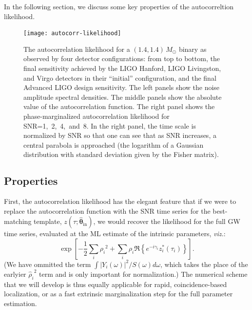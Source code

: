 \documentclass[amsmath,amssymb,aps,prx,reprint,nopreprintnumbers,nofootinbib]{revtex4-1}
\begin{document}
In the following section, we discuss some key properties of the autocorreltion likelihood.

\begin{figure}
    \texttt{[image: autocorr-likelihood]}
    \caption{\label{fig:autocorr-likelihood}The autocorrelation likelihood for a $(1.4, 1.4)$\,$M_\odot$ binary as observed by four detector configurations: from top to bottom, the final sensitivity achieved by the \acs{LIGO} Hanford, \acs{LIGO} Livingston, and Virgo detectors in their ``initial'' configuration, and the final Advanced \acs{LIGO} design sensitivity. The left panels show the noise amplitude spectral densities. The middle panels show the absolute value of the autocorrelation function. The right panel shows the phase-marginalized autocorrelation likelihood for \ac{SNR}=1,~2,~4,~and~8. In the right panel, the time scale is normalized by \ac{SNR} so that one can see that as \ac{SNR} increases, a central parabola is approached (the logarithm of a Gaussian distribution with standard deviation given by the Fisher matrix).}
\end{figure}

\subsection{Properties}
\label{sec:properties}

First, the autocorrelation likelihood has the elegant feature that if we were to replace the autocorrelation function with the \ac{SNR} time series for the best-matching template, $z(\tau; \hat{\mathbf{\theta}}_\mathrm{in})$, we would recover the likelihood for the full \ac{GW} time series, evaluated at the \ac{ML} estimate of the intrinsic parameters, \emph{viz.}:
%
\begin{equation}\label{eq:extrinsic-only-likelihood}
    \exp \left[ - \frac{1}{2} \sum_i {\rho_i}^2
        + \sum_i \rho_i \Re \left\{ e^{-i \gamma_i} z_i^*(\tau_i)
        \right\}
    \right].
\end{equation}
%
(We have ommitted the term $\int |Y_i(\omega)|^2/S(\omega)d\omega$, which takes the place of the earlyier ${\hat{\rho}_i}^2$ term and is only important for normalization.) The numerical scheme that we will develop is thus equally applicable for rapid, coincidence-based localization, or as a fast extrinsic marginalization step for the full parameter estimation.
\end{document}

